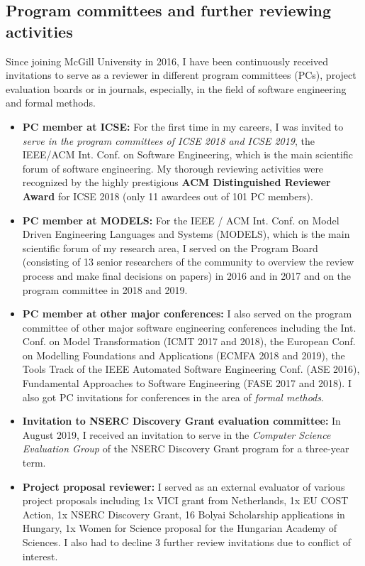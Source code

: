 \subsection{Program committees and further reviewing activities}
Since joining McGill University in 2016, I have been continuously received invitations to serve as a reviewer in different program committees (PCs), project evaluation boards or in journals, especially, in the field of software engineering and formal methods. 

\begin{itemize}[leftmargin=0.5cm]
\item \textbf{PC member at ICSE:}
For the first time in my careers, I was invited to \emph{serve in the program committees of ICSE 2018 and ICSE 2019}, the IEEE/ACM Int. Conf. on Software Engineering, which is the main scientific forum of software engineering. My thorough reviewing activities were recognized by the highly prestigious \textbf{ACM Distinguished Reviewer Award} for ICSE 2018 (only 11 awardees out of 101 PC members). 

\item \textbf{PC member at MODELS:}
For the IEEE / ACM Int. Conf. on Model Driven Engineering Languages and Systems (MODELS), which is the main scientific forum of my research area, I served on the Program Board (consisting of 13 senior researchers of the community to overview the review process and make final decisions on papers) in 2016 and in 2017 and on the program committee in 2018 and 2019. 

\item \textbf{PC member at other major conferences:}
I also served on the program committee of other major software engineering conferences including the 
Int. Conf. on Model Transformation (ICMT 2017 and 2018), the European Conf. on Modelling Foundations and Applications (ECMFA 2018 and 2019), the Tools Track of the IEEE Automated Software Engineering Conf. (ASE 2016), Fundamental Approaches to Software Engineering (FASE 2017 and 2018). I also got PC invitations for conferences in the area of \emph{formal methods}.

\item \textbf{Invitation to NSERC Discovery Grant evaluation committee:}
In August 2019, I received an invitation to serve in the \emph{Computer Science Evaluation Group} of the NSERC Discovery Grant program for a three-year term.

\item \textbf{Project proposal reviewer:}
I served as an external evaluator of various project proposals including 1x VICI grant from Netherlands, 1x EU COST Action, 1x NSERC Discovery Grant, 16 Bolyai Scholarship applications in Hungary, 1x Women for Science proposal for the Hungarian Academy of Sciences. I also had to decline 3 further review invitations due to conflict of interest.


\end{itemize}
